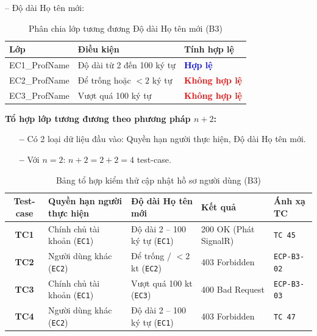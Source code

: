 \documentclass[11pt,a4paper]{article}
\begin{document}
\noindent -- Độ dài Họ tên mới:
\begin{table}[H]
\centering
\small
\begin{tabularx}{\textwidth}{|L{3.0cm}|X|C{3.2cm}|}
\hline
{}
\textbf{Lớp} & \textbf{Điều kiện} & \textbf{Tính hợp lệ} \tabularnewline
\hline
EC1\_ProfName & Độ dài từ 2 đến 100 ký tự & \textcolor{blue}{\textbf{Hợp lệ}} \\ \hline
EC2\_ProfName & Để trống hoặc $< 2$ ký tự & \textcolor{red}{\textbf{Không hợp lệ}} \\ \hline
EC3\_ProfName & Vượt quá 100 ký tự & \textcolor{red}{\textbf{Không hợp lệ}} \\ \hline
\end{tabularx}
\caption{Phân chia lớp tương đương Độ dài Họ tên mới (B3)}
\end{table}

\noindent\textbf{Tổ hợp lớp tương đương theo phương pháp $n+2$:}
\begin{itemize}[leftmargin=1.2cm, noitemsep]
    \item[\textbf{--}] Có 2 loại dữ liệu đầu vào: Quyền hạn người thực hiện, Độ dài Họ tên mới.
    \item[\textbf{--}] Với $n = 2$: $n + 2 = 2 + 2 = 4$ test-case.
\end{itemize}
\begin{table}[H]
\centering
\small
\begin{tabularx}{\textwidth}{|c|X|X|L{3.5cm}|C{2.1cm}|}
\hline
{}
\textbf{Test-case} & \textbf{Quyền hạn người thực hiện} & \textbf{Độ dài Họ tên mới} & \textbf{Kết quả} & \textbf{Ánh xạ TC} \tabularnewline
\hline
\textbf{TC1} & Chính chủ tài khoản (\texttt{EC1}) & Độ dài 2 -- 100 ký tự (\texttt{EC1}) & 200 OK (Phát SignalR) & \texttt{TC 45} \\ \hline
\textbf{TC2} & Người dùng khác (\texttt{EC2}) & Để trống / $< 2$ kt (\texttt{EC2}) & 403 Forbidden & \texttt{ECP-B3-02} \\ \hline
\textbf{TC3} & Chính chủ tài khoản (\texttt{EC1}) & Vượt quá 100 kt (\texttt{EC3}) & 400 Bad Request & \texttt{ECP-B3-03} \\ \hline
\textbf{TC4} & Người dùng khác (\texttt{EC2}) & Độ dài 2 -- 100 ký tự (\texttt{EC1}) & 403 Forbidden & \texttt{TC 47} \\ \hline
\end{tabularx}
\caption{Bảng tổ hợp kiểm thử cập nhật hồ sơ người dùng (B3)}
\end{table}
\end{document}
